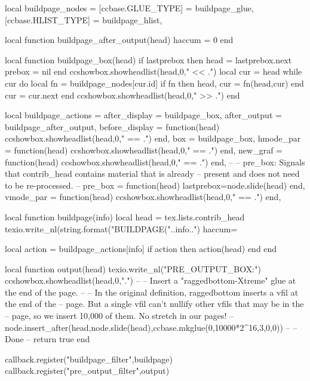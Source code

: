 local buildpage_nodes = {
  [ccbase.GLUE_TYPE]  = buildpage_glue,
  [ccbase.HLIST_TYPE] = buildpage_hlist,
}

local function buildpage_after_output(head)
  haccum = 0
end

local function buildpage_box(head)
  if lastprebox then
    head = lastprebox.next
    prebox = nil
  end
  ccshowbox.showheadlist(head,0,"  << .")
  local cur = head
  while cur do
    local fn = buildpage_nodes[cur.id]
    if fn then head, cur = fn(head,cur) end
    cur = cur.next
  end
  ccshowbox.showheadlist(head,0,"  >> .")
end

local buildpage_actions = {
  after_display  = buildpage_box,
  after_output   = buildpage_after_output,
  before_display = function(head) ccshowbox.showheadlist(head,0,"  == .") end,
  box            = buildpage_box,
  hmode_par      = function(head) ccshowbox.showheadlist(head,0,"  == .") end,
  new_graf       = function(head) ccshowbox.showheadlist(head,0,"  == .") end,
  --
  -- pre_box: Signals that contrib_head contains material that is already
  -- present and does not need to be re-processed.
  --
  pre_box        = function(head) lastprebox=node.slide(head) end,
  vmode_par      = function(head) ccshowbox.showheadlist(head,0,"  == .") end,
}

local function buildpage(info)
  local head = tex.lists.contrib_head
  texio.write_nl(string.format("BUILDPAGE("..info..") haccum=%

  local action = buildpage_actions[info]
  if action then action(head) end
end

local function output(head)
  texio.write_nl("PRE_OUTPUT_BOX:")
  ccshowbox.showheadlist(head,0,".")
  --
  -- Insert a "raggedbottom-Xtreme" glue at the end of the page.
  --
  -- In the original definition, raggedbottom inserts a vfil at the end of the
  -- page. But a single vfil can't nullify other vfils that may be in the
  -- page, so we insert 10,000 of them. No stretch in our pages!
  --
  node.insert_after(head,node.slide(head),ccbase.mkglue(0,10000*2^16,3,0,0))
  --
  -- Done
  --
  return true
end

callback.register("buildpage_filter",buildpage)
callback.register("pre_output_filter",output)

